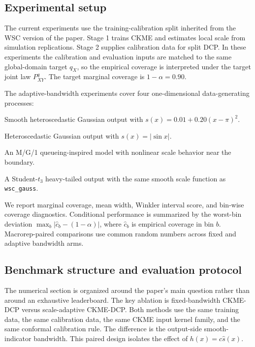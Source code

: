 \documentclass[11pt]{article}
\begin{document}
\subsection{Experimental setup}

The current experiments use the training-calibration split inherited from the WSC version of the paper. Stage 1 trains CKME and estimates local scale from simulation replications. Stage 2 supplies calibration data for split DCP. In these experiments the calibration and evaluation inputs are matched to the same global-domain target \(q_X\), so the empirical coverage is interpreted under the target joint law \(P^q_{XY}\). The target marginal coverage is \(1-\alpha=0.90\).

The adaptive-bandwidth experiments cover four one-dimensional data-generating processes:
\begin{description}[leftmargin=1.7em]
  \item[\texttt{wsc\_gauss}] Smooth heteroscedastic Gaussian output with \(s(x)=0.01+0.20(x-\pi)^2\).
  \item[\texttt{gibbs\_s1}] Heteroscedastic Gaussian output with \(s(x)=|\sin x|\).
  \item[\texttt{exp1}] An M/G/1 queueing-inspired model with nonlinear scale behavior near the boundary.
  \item[\texttt{nongauss\_A1L}] A Student-\(t_3\) heavy-tailed output with the same smooth scale function as \texttt{wsc\_gauss}.
\end{description}

We report marginal coverage, mean width, Winkler interval score, and bin-wise coverage diagnostics. Conditional performance is summarized by the worst-bin deviation \(\max_b|\widehat c_b-(1-\alpha)|\), where \(\widehat c_b\) is empirical coverage in bin \(b\). Macrorep-paired comparisons use common random numbers across fixed and adaptive bandwidth arms.

\subsection{Benchmark structure and evaluation protocol}
\label{sec:benchmarks}

The numerical section is organized around the paper's main question rather than around an exhaustive leaderboard. The key ablation is fixed-bandwidth CKME-DCP versus scale-adaptive CKME-DCP. Both methods use the same training data, the same calibration data, the same CKME input kernel family, and the same conformal calibration rule. The difference is the output-side smooth-indicator bandwidth. This paired design isolates the effect of \(h(x)=c\widehat s(x)\).
\end{document}
